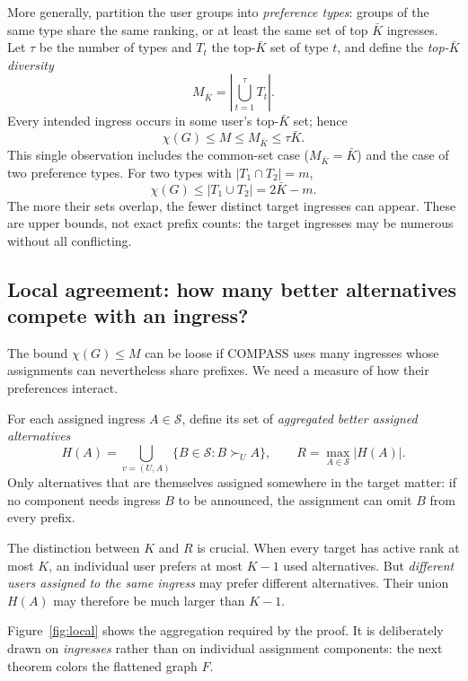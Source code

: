 \documentclass[10pt,a4paper]{article}
\newcommand{\Sset}{\mathcal S}
\begin{document}
More generally, partition the user groups into \emph{preference types}: groups of the same type share the same ranking, or at least the same set of top $\bar K$ ingresses. Let $\tau$ be the number of types and $T_t$ the top-$\bar K$ set of type $t$, and define the \emph{top-$\bar K$ diversity}
\[
M_{\bar K}=\left|\bigcup_{t=1}^{\tau}T_t\right|.
\]
Every intended ingress occurs in some user's top-$\bar K$ set; hence
\begin{equation}\label{eq:global}
\boxed{\chi(G)\le M\le M_{\bar K}\le \tau \bar K.}
\end{equation}
This single observation includes the common-set case ($M_{\bar K}=\bar K$) and the case of two preference types. For two types with $|T_1\cap T_2|=m$,
\begin{equation}\label{eq:two}
\chi(G)\le |T_1\cup T_2|=2\bar K-m.
\end{equation}
The more their sets overlap, the fewer distinct target ingresses can appear. These are upper bounds, not exact prefix counts: the target ingresses may be numerous without all conflicting.

\subsection{Local agreement: how many better alternatives compete with an ingress?}

The bound $\chi(G)\le M$ can be loose if COMPASS uses many ingresses whose assignments can nevertheless share prefixes. We need a measure of how their preferences interact.

For each assigned ingress $A\in\Sset$, define its set of \emph{aggregated better assigned alternatives}
\begin{equation}\label{eq:H}
H(A)=\bigcup_{v=(U,A)}\bigl\{B\in\Sset:B\succ_U A\bigr\},
\qquad
R=\max_{A\in\Sset}|H(A)|.
\end{equation}
Only alternatives that are themselves assigned somewhere in the target matter: if no component needs ingress $B$ to be announced, the assignment can omit $B$ from every prefix.

The distinction between $K$ and $R$ is crucial. When every target has active rank at most $K$, an individual user prefers at most $K-1$ used alternatives. But \emph{different users assigned to the same ingress} may prefer different alternatives. Their union $H(A)$ may therefore be much larger than $K-1$.

Figure~\ref{fig:local} shows the aggregation required by the proof. It is deliberately drawn on \emph{ingresses} rather than on individual assignment components: the next theorem colors the flattened graph $F$.
\end{document}
